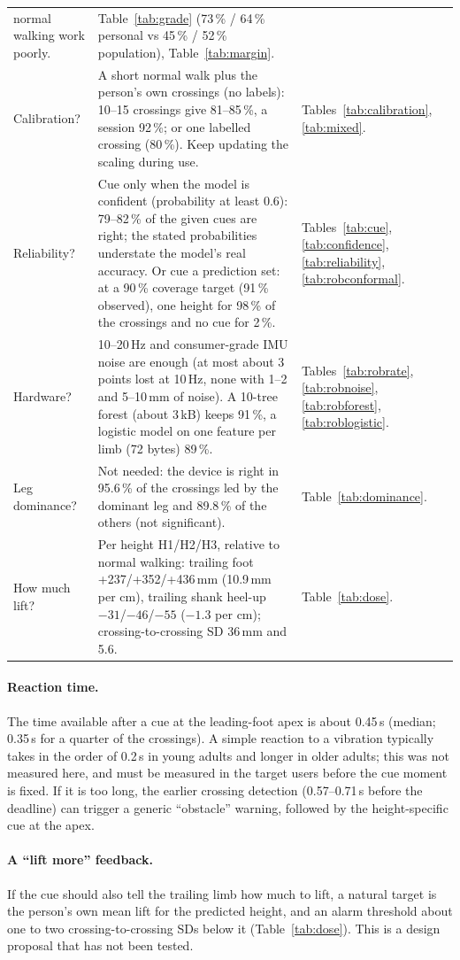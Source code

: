 \begin{table}[htbp]
\begin{tabular}{@{}p{2.6cm} p{7.4cm} p{5.6cm}@{}}
normal walking work poorly. & Table~\ref{tab:grade} (73\,\% / 64\,\% personal vs 45\,\% / 52\,\% population), Table~\ref{tab:margin}. \\
\addlinespace
Calibration? & A short normal walk plus the person's own crossings (no labels): 10--15 crossings give 81--85\,\%, a session 92\,\%;
or one labelled crossing (80\,\%). Keep updating the scaling during use. & Tables~\ref{tab:calibration}, \ref{tab:mixed}. \\
\addlinespace
Reliability? & Cue only when the model is confident (probability at least 0.6): 79--82\,\% of the given cues are right; the stated
probabilities understate the model's real accuracy. Or cue a prediction set: at a 90\,\% coverage target (91\,\% observed), one
height for 98\,\% of the crossings and no cue for 2\,\%. & Tables~\ref{tab:cue}, \ref{tab:confidence}, \ref{tab:reliability},
\ref{tab:robconformal}. \\
\addlinespace
Hardware? & 10--20\,Hz and consumer-grade IMU noise are enough (at most about 3 points lost at 10\,Hz, none with
1--2\textdegree{} and 5--10\,mm of noise). A 10-tree forest (about 3\,kB) keeps 91\,\%, a logistic model on one feature per limb
(72 bytes) 89\,\%. & Tables~\ref{tab:robrate}, \ref{tab:robnoise}, \ref{tab:robforest}, \ref{tab:roblogistic}. \\
\addlinespace
Leg dominance? & Not needed: the device is right in 95.6\,\% of the crossings led by the dominant leg and 89.8\,\% of the others
(not significant). & Table~\ref{tab:dominance}. \\
\addlinespace
How much lift? & Per height H1/H2/H3, relative to normal walking: trailing foot +237/+352/+436\,mm (10.9\,mm per cm), trailing shank
heel-up $-31$/$-46$/$-55$\textdegree{} ($-1.3$\textdegree{} per cm); crossing-to-crossing SD 36\,mm and 5.6\textdegree{}. &
Table~\ref{tab:dose}. \\
\bottomrule
\end{tabular}
\end{table}

\paragraph{Reaction time.} The time available after a cue at the leading-foot apex is about 0.45\,s (median; 0.35\,s for a quarter of
the crossings). A simple reaction to a vibration typically takes in the order of 0.2\,s in young adults and longer in older adults;
this was not measured here, and must be measured in the target users before the cue moment is fixed. If it is too long, the earlier
crossing detection (0.57--0.71\,s before the deadline) can trigger a generic ``obstacle'' warning, followed by the height-specific
cue at the apex.

\paragraph{A ``lift more'' feedback.} If the cue should also tell the trailing limb how much to lift, a natural target is the
person's own mean lift for the predicted height, and an alarm threshold about one to two crossing-to-crossing SDs below it
(Table~\ref{tab:dose}). This is a design proposal that has not been tested.
